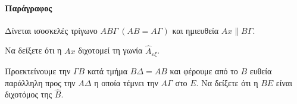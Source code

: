 \documentclass[11pt,a4paper,modern]{FFExercises}
\begin{document}
\paragraph{Παράγραφος}
\askhsh Δίνεται ισοσκελές τρίγωνο $AB\varGamma\ (ΑΒ=Α\varGamma)$ και ημιευθεία $Ax\parallel B\varGamma$.
\begin{alist}
\item Να δείξετε ότι η $Ax$ διχοτομεί τη γωνία $\hat{A}_{\varepsilon\xi}$.
\item Προεκτείνουμε την $\varGamma B$ κατά τμήμα $B\varDelta=AB$ και φέρουμε από το $B$ ευθεία παράλληλη προς την $A\varDelta$ η οποία τέμνει την $A\varGamma$ στο $E$. Να δείξετε ότι η $BE$ είναι διχοτόμος της $\hat{B}$.
\end{alist}  
\end{document}
